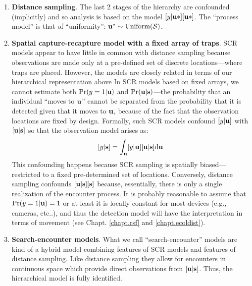 \begin{enumerate}
\item {\bf Distance sampling}. The last 2 stages of the hierarchy
  are confounded (implicitly) and so analysis is based on the model
  $[y|{\bf u}*] [{\bf u}*]$. The ``process model'' is that of ``uniformity'': ${\bf u}^{*}
  \sim \text{Uniform}({\cal S})$.

\item {\bf Spatial capture-recapture model with a fixed array of traps}.
SCR models appear to have little in common with distance sampling
because observations are made only at a pre-defined set of discrete
locations---where traps are placed. However, the models are closely
related in terms of our hierarchical representation above
In SCR models based on fixed arrays, we cannot estimate both
$\Pr(y=1|{\bf u})$ and $\Pr({\bf u}|{\bf s})$---the probability that
an individual ``moves to ${\bf u}$'' cannot be separated from the
probability that it is detected given that it moves to ${\bf u}$,
because of the fact that the observation locations are fixed by
design.
Formally, such SCR models confound $[y|{\bf u}]$  with $[{\bf
  u}|{\bf s}]$ so that the observation model arises as:
\[
 [y|{\bf s}] = \int_{\bf u} [y|{\bf u}][{\bf u}|{\bf s}] \mathrm{d}{\bf u}
\]
This confounding happens because SCR sampling is spatially
biased---restricted to a fixed pre-determined set of locations.
Conversely,
distance sampling confounds $[{\bf u}|{\bf s}][{\bf s}]$ because, essentially, there is
only a single realization of the encounter process.
It is probably
reasonable to assume that $\Pr(y=1|{\bf u})=1$ or at least it is locally
constant for most devices (e.g., cameras, etc..), and thus the
detection model will have the interpretation in terms of movement (see
Chapt. \ref{chapt.rsf} and \ref{chapt.ecoldist}).

\item {\bf Search-encounter models}. What we call
  ``search-encounter'' models \citep{royle_young:2008,royle_etal:2011mee}
  are kind of a hybrid model combining features of SCR models and
  features of distance sampling. Like distance sampling they allow for
  encounters in continuous space which provide direct observations
  from $[{\bf u}|{\bf s}]$. Thus, the
  hierarchical model is fully identified.


\end{enumerate}
